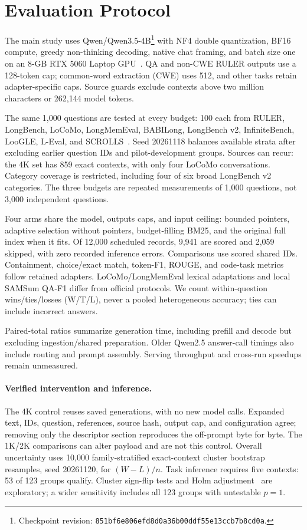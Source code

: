 \documentclass[runningheads]{llncs}
\begin{document}
\section{Evaluation Protocol}
The main study uses Qwen/Qwen3.5-4B\footnote{Checkpoint revision: \texttt{851bf6e806efd8d0a36b00ddf55e13ccb7b8cd0a}.} with NF4 double quantization, BF16 compute, greedy non-thinking decoding, native chat framing, and batch size one on an 8-GB RTX 5060 Laptop GPU~\cite{dettmers2023qlora}. QA and non-CWE RULER outputs use a 128-token cap; common-word extraction (CWE) uses 512, and other tasks retain adapter-specific caps. Source guards exclude contexts above two million characters or 262,144 model tokens.

The same 1,000 questions are tested at every budget: 100 each from RULER, LongBench, LoCoMo, LongMemEval, BABILong, LongBench v2, InfiniteBench, LooGLE, L-Eval, and SCROLLS~\cite{hsieh2024ruler,bai2024longbench,maharana2024locomo,wu2024longmemeval,kuratov2024babilong,bai2024longbenchv2,zhang2024infinitebench,li2024loogle,an2024leval,shaham2022scrolls}. Seed 20261118 balances available strata after excluding earlier question IDs and pilot-development groups. Sources can recur: the 4K set has 859 exact contexts, with only four LoCoMo conversations. Category coverage is restricted, including four of six broad LongBench v2 categories. The three budgets are repeated measurements of 1,000 questions, not 3,000 independent questions.

Four arms share the model, outputs caps, and input ceiling: bounded pointers, adaptive selection without pointers, budget-filling BM25, and the original full index when it fits. Of 12,000 scheduled records, 9,941 are scored and 2,059 skipped, with zero recorded inference errors. Comparisons use scored shared IDs. Containment, choice/exact match, token-F1, ROUGE, and code-task metrics follow retained adapters. LoCoMo/LongMemEval lexical adaptations and local SAMSum QA-F1 differ from official protocols. We count within-question wins/ties/losses (W/T/L), never a pooled heterogeneous accuracy; ties can include incorrect answers.

Paired-total ratios summarize generation time, including prefill and decode but excluding ingestion/shared preparation. Older Qwen2.5 answer-call timings also include routing and prompt assembly. Serving throughput and cross-run speedups remain unmeasured.

\paragraph{Verified intervention and inference.}
The 4K control reuses saved generations, with no new model calls. Expanded text, IDs, question, references, source hash, output cap, and configuration agree; removing only the descriptor section reproduces the off-prompt byte for byte. The 1K/2K comparisons can alter payload and are not this control. Overall uncertainty uses 10,000 family-stratified exact-context cluster bootstrap resamples, seed 20261120, for $(W-L)/n$. Task inference requires five contexts: 53 of 123 groups qualify. Cluster sign-flip tests and Holm adjustment~\cite{holm1979} are exploratory; a wider sensitivity includes all 123 groups with untestable $p=1$.
\end{document}

